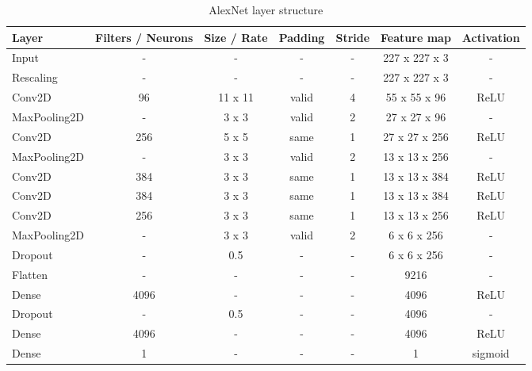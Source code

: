\documentclass[10pt, final]{article}
\begin{document}
\begin{table}[!ht]
	\centering
	\begin{tabular}{l c c c c c c}
		Layer        & Filters / Neurons & Size / Rate & Padding & Stride & Feature map   & Activation \\
		\hline
		Input        & -                 & -           & -       & -      & 227 x 227 x 3 & -          \\
		Rescaling    & -                 & -           & -       & -      & 227 x 227 x 3 & -          \\
		Conv2D       & 96                & 11 x 11     & valid   & 4      & 55 x 55 x 96  & ReLU       \\
		MaxPooling2D & -                 & 3 x 3       & valid   & 2      & 27 x 27 x 96  & -          \\
		Conv2D       & 256               & 5 x 5       & same    & 1      & 27 x 27 x 256 & ReLU       \\
		MaxPooling2D & -                 & 3 x 3       & valid   & 2      & 13 x 13 x 256 & -          \\
		Conv2D       & 384               & 3 x 3       & same    & 1      & 13 x 13 x 384 & ReLU       \\
		Conv2D       & 384               & 3 x 3       & same    & 1      & 13 x 13 x 384 & ReLU       \\
		Conv2D       & 256               & 3 x 3       & same    & 1      & 13 x 13 x 256 & ReLU       \\
		MaxPooling2D & -                 & 3 x 3       & valid   & 2      & 6 x 6 x 256   & -          \\
		Dropout      & -                 & 0.5         & -       & -      & 6 x 6 x 256   & -          \\
		Flatten      & -                 & -           & -       & -      & 9216          & -          \\
		Dense        & 4096              & -           & -       & -      & 4096          & ReLU       \\
		Dropout      & -                 & 0.5         & -       & -      & 4096          & -          \\
		Dense        & 4096              & -           & -       & -      & 4096          & ReLU       \\
		Dense        & 1                 & -           & -       & -      & 1             & sigmoid    \\
		\hline
	\end{tabular}
	\caption{AlexNet layer structure}
	\label{table:AlexNet_struct}
\end{table}
\end{document}
